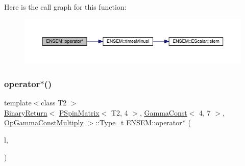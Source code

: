 Here is the call graph for this function\+:\nopagebreak
\begin{figure}[H]
\begin{center}
\leavevmode
\includegraphics[width=350pt]{d6/df5/group__primspinmatrix_gaf04b1dbd5214d0a0e3a846a865a23f0e_cgraph}
\end{center}
\end{figure}
\mbox{\label{group__primspinmatrix_gaf6e9dc0eef99b0575741077a24d33399}} 
\subsubsection{\texorpdfstring{operator$\ast$()}{operator*()}\hspace{0.1cm}{\footnotesize\ttfamily [24/64]}}
{\footnotesize\ttfamily template$<$class T2 $>$ \\
\mbox{\hyperlink{structENSEM_1_1BinaryReturn}{Binary\+Return}}$<$ \mbox{\hyperlink{classENSEM_1_1PSpinMatrix}{P\+Spin\+Matrix}}$<$ T2, 4 $>$, \mbox{\hyperlink{classENSEM_1_1GammaConst}{Gamma\+Const}}$<$ 4, 7 $>$, \mbox{\hyperlink{structENSEM_1_1OpGammaConstMultiply}{Op\+Gamma\+Const\+Multiply}} $>$\+::Type\+\_\+t E\+N\+S\+E\+M\+::operator$\ast$ (\begin{DoxyParamCaption}\item[{const \mbox{\hyperlink{classENSEM_1_1PSpinMatrix}{P\+Spin\+Matrix}}$<$ T2, 4 $>$ \&}]{l,  }\item[{const \mbox{\hyperlink{classENSEM_1_1GammaConst}{Gamma\+Const}}$<$ 4, 7 $>$ \&}]{ }\end{DoxyParamCaption})\hspace{0.3cm}{\ttfamily [inline]}}

\mbox{\label{group__primspinmatrix_ga309ed45c5c034e83f1f24061ca0a5cdc}} 
